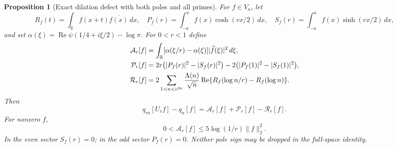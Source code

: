 \documentclass[11pt]{article}
\newtheorem{proposition}[theorem]{Proposition}
\theoremstyle{remark}
\begin{document}
\begin{proposition}[Exact dilation defect with both poles and all primes]
\label{prop:ns55fc-dilation}
For $f\in V_a$, let
\[
 R_f(t)=\int_{\mathbb R}f(x+t)\overline{f(x)}\,dx,
 \quad P_f(r)=\int_{-a}^a f(x)\cosh(rx/2)\,dx,
 \quad S_f(r)=\int_{-a}^a f(x)\sinh(rx/2)\,dx,
\]
and set $\alpha(\xi)=\operatorname{Re}\psi(1/4+i\xi/2)-\log\pi$.
For $0<r<1$ define
\begin{align}
 \mathcal A_r[f]&=\int_{\mathbb R}
    [\alpha(\xi/r)-\alpha(\xi)]|\widehat f(\xi)|^2\,d\xi,
       \label{eq:ns55fc-arch}\\
 \mathcal P_r[f]&=2r\bigl(|P_f(r)|^2-|S_f(r)|^2\bigr)
                  -2\bigl(|P_f(1)|^2-|S_f(1)|^2\bigr),\notag\\
 \mathcal R_r[f]&=2\sum_{1<n<e^{2a}}\frac{\Lambda(n)}{\sqrt n}
          \operatorname{Re}\{R_f(\log n/r)-R_f(\log n)\}.
          \notag
\end{align}
Then
\begin{equation}\label{eq:ns55fc-defect}
 q_{ra}[U_rf]-q_a[f]
       =\mathcal A_r[f]+\mathcal P_r[f]-\mathcal R_r[f].
\end{equation}
For nonzero $f$,
\begin{equation}\label{eq:ns55fc-arch-bound}
 0<\mathcal A_r[f]\le5\log(1/r)\|f\|_2^2.
\end{equation}
In the even sector $S_f(r)=0$; in the odd sector $P_f(r)=0$.
Neither pole sign may be dropped in the full-space identity.
\end{proposition}
\end{document}
